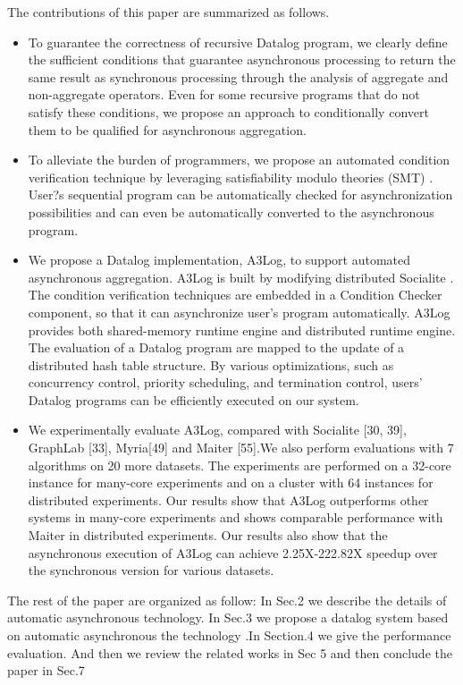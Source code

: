 \documentclass{vldb}
\begin{document}
The contributions of this paper are summarized as follows.
\begin{itemize}
	\item To guarantee the correctness of recursive Datalog program, we clearly define the sufficient conditions that guarantee asynchronous processing to return the same result as synchronous processing through the analysis of aggregate and non-aggregate operators. Even for some recursive programs that do not satisfy these conditions, we propose an approach to conditionally convert them to be qualified for asynchronous aggregation.
	\item To alleviate the burden of programmers, we propose an automated condition verification technique by leveraging satisfiability modulo theories
	(SMT) . User?s sequential program can be automatically checked for asynchronization possibilities and can even be automatically converted to the asynchronous program.
	\item We propose a Datalog implementation, A3Log, to support automated asynchronous aggregation. A3Log is built by modifying distributed Socialite \cite{}. The condition verification techniques are embedded in a Condition Checker component, so that it can asynchronize user's program automatically. A3Log provides both shared-memory runtime engine and distributed runtime engine. The evaluation of a Datalog program are mapped to the update of a distributed hash table structure. By various optimizations, such as concurrency control, priority scheduling, and termination control, users' Datalog programs can be efficiently executed on our system.
	\item We experimentally evaluate A3Log, compared with Socialite [30, 39], GraphLab [33], Myria[49] and Maiter [55].We also perform evaluations with 7 algorithms on 20 more datasets. The experiments are performed on a 32-core instance for many-core experiments and on a cluster with 64 instances for distributed experiments. Our results show that A3Log outperforms other systems in many-core experiments and shows comparable performance with Maiter in distributed experiments. Our results also show that the asynchronous execution of A3Log can achieve 2.25X-222.82X speedup over the synchronous version for various datasets.
\end{itemize}

The rest of the paper are organized as follow: In Sec.2 we describe the details of  automatic asynchronous technology. In Sec.3 we propose a datalog system based on automatic asynchronous the technology .In Section.4  we give the performance evaluation. And then we review the related works in Sec 5 and then conclude the paper in Sec.7
\end{document}
